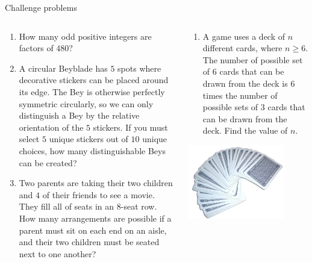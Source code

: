 \documentclass[9pt,aspectratio=169]{beamer}
\begin{document}
\begin{frame}{Challenge problems}
  \begin{columns}[T]
    \begin{column}{0.5\textwidth}
      \begin{enumerate}
        \item How many odd positive integers are factors of $480$?​
        \item A circular Beyblade has $5$ spots where decorative stickers can be placed around its edge. The Bey is otherwise perfectly symmetric circularly, so we can only distinguish a Bey by the relative orientation of the $5$ stickers.  If you must select $5$ unique stickers out of $10$ unique choices, how many distinguishable Beys can be created?​
        \item Two parents are taking their two children and $4$ of their friends to see a movie. They fill all of seats in an $8$-seat row. How many arrangements are possible if a parent must sit on each end on an aisle, and their two children must be seated next to one another?
        \seti
      \end{enumerate}
    \end{column}
    \begin{column}{0.5\textwidth}
      \begin{enumerate}
        \conti
        \item A game uses a deck of $n$ different cards, where $n \geq 6$. The number of possible set of $6$ cards that can be drawn from the deck is $6$ times the number of possible sets of $3$ cards that can be drawn from the deck. Find the value of $n$.
      \end{enumerate}
      \begin{center}
        \vspace*{1em}
        \includegraphics[width=0.8\textwidth]{02 - Combinatorics 101/cards.jpg}
      \end{center}
    \end{column}
  \end{columns}
\end{frame}
\end{document}
